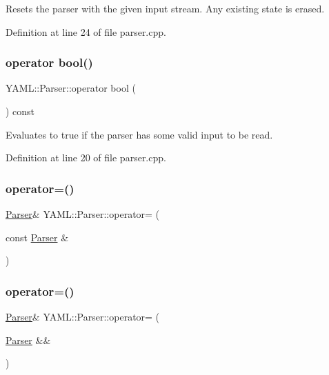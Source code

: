 Resets the parser with the given input stream. Any existing state is erased. 

Definition at line 24 of file parser.\+cpp.

\mbox{\label{class_y_a_m_l_1_1_parser_a292eda06e37bf6460d421460341e9c47}} 
\subsubsection{\texorpdfstring{operator bool()}{operator bool()}}
{\footnotesize\ttfamily Y\+A\+M\+L\+::\+Parser\+::operator bool (\begin{DoxyParamCaption}{ }\end{DoxyParamCaption}) const\hspace{0.3cm}{\ttfamily [explicit]}}

Evaluates to true if the parser has some valid input to be read. 

Definition at line 20 of file parser.\+cpp.

\mbox{\label{class_y_a_m_l_1_1_parser_abcfdbdd14d7847a960e82bb3cfe682e7}} 
\subsubsection{\texorpdfstring{operator=()}{operator=()}\hspace{0.1cm}{\footnotesize\ttfamily [1/2]}}
{\footnotesize\ttfamily \mbox{\hyperlink{class_y_a_m_l_1_1_parser}{Parser}}\& Y\+A\+M\+L\+::\+Parser\+::operator= (\begin{DoxyParamCaption}\item[{const \mbox{\hyperlink{class_y_a_m_l_1_1_parser}{Parser}} \&}]{ }\end{DoxyParamCaption})\hspace{0.3cm}{\ttfamily [delete]}}

\mbox{\label{class_y_a_m_l_1_1_parser_a2af7e07c9e09cb4a9e79708f39d5d901}} 
\subsubsection{\texorpdfstring{operator=()}{operator=()}\hspace{0.1cm}{\footnotesize\ttfamily [2/2]}}
{\footnotesize\ttfamily \mbox{\hyperlink{class_y_a_m_l_1_1_parser}{Parser}}\& Y\+A\+M\+L\+::\+Parser\+::operator= (\begin{DoxyParamCaption}\item[{\mbox{\hyperlink{class_y_a_m_l_1_1_parser}{Parser}} \&\&}]{ }\end{DoxyParamCaption})\hspace{0.3cm}{\ttfamily [default]}}

